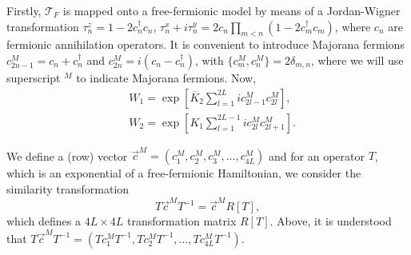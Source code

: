 \documentclass[prl,twocolumn,showpacs,floatfix,superscriptaddress,nofootinbib]{revtex4-1}
\newcommand{\Br}[1]{\left[#1\right]}
\begin{document}
Firstly, $\mathcal{T}_F$ is mapped onto a free-fermionic model by means of a Jordan-Wigner transformation $\tau_n^z = 1-2 c_n^\dagger c_n$, $\tau^x_n + i \tau^y_n = 2 c_n \prod_{m<n} \left( 1-2 c^\dagger_m c_m \right)$, where $c_n$ are fermionic annihilation operators. 
It is convenient to introduce Majorana fermions $c^M_{2n-1} = c_n + c_n^\dagger$ and $c^M_{2n} = i( c_n  - c_n^\dagger)$, with $\{c^M_m,c^M_n\}=2 \delta_{m,n}$, where we will use superscript $^M$ to indicate Majorana fermions.
Now, 
\begin{eqnarray*}  
   &W_1 = \exp\Br{\overline K_2 \sum_{l=1}^{2L}  i c^M_{2l-1} c^M_{2l}},  \\
   &W_2 = \exp\Br{ K_1 \sum_{l=1}^{2L-1} i c^M_{2l} c^M_{2l+1}}. 
\end{eqnarray*}

\noindent We define a (row) vector $\vec c^M = (c^M_1,c^M_2,c^M_3, \ldots, c^M_{4L})$ and for an operator $T$, which is an exponential of a free-fermionic Hamiltonian, we consider the similarity transformation
\begin{equation}
\label{eq_a_similarity}
T \vec c^M T^{-1} = \vec c^M R[T],
\end{equation}
which defines a $4 L \times 4 L $ transformation matrix $R[T]$. Above, it is understood that $T \vec c^M T^{-1} = (T c^M_1 T^{-1}, T c^M_2 T^{-1} , \ldots, T c^M_{4L} T^{-1})$.
\end{document}
